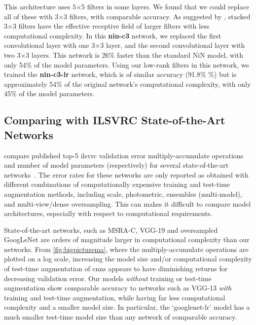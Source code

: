 \documentclass[thesis]{subfiles}
\begin{document}
    This architecture uses $5$$\times$$5$ filters in some layers. We found that we could replace all of these with $3$$\times$$3$ filters, with comparable accuracy. As suggested by \citet{Simonyan2014verydeep}, stacked  $3$$\times$$3$ filters have the effective receptive field of larger filters with less computational complexity. In this \textbf{nin-c3} network, we replaced the first convolutional layer with one $3$$\times$$3$ layer, and the second convolutional layer with two $3$$\times$$3$ layers. This network is 26\% faster than the standard NiN model, with only 54\% of the model parameters. Using our low-rank filters in this network, we trained the \textbf{nin-c3-lr} network, which is of similar accuracy (91.8\% \%) but is approximately 54\% of the original network's computational complexity, with only 45\% of the model parameters.
    
    \subsection{Comparing with ILSVRC State-of-the-Art Networks}
     compare published top-5 \gls{ilsvrc} validation error \vs multiply-accumulate operations and number of model parameters (respectively) for several state-of-the-art networks~\citep{Simonyan2014verydeep,Szegedy2014going,He2015b}. The error rates for these networks are only reported as obtained with different combinations of computationally expensive training and test-time augmentation methods, including scale, photometric, ensembles (multi-model), and multi-view/dense oversampling. This can makes it difficult to compare model architectures, especially with respect to computational requirements.
    
    State-of-the-art networks, such as MSRA-C, VGG-19 and oversampled GoogLeNet are orders of magnitude larger in computational complexity than our networks. From \cref{fig:bigpicturema}, where the multiply-accumulate operations are plotted on a log scale, increasing the model size and/or computational complexity of test-time augmentation of \glspl{cnn} appears to have diminishing returns for decreasing validation error. Our models \emph{without} training or test-time augmentation show comparable accuracy to networks such as VGG-13 \emph{with} training and test-time augmentation, while having far less computational complexity and a smaller model size. In particular, the `googlenet-lr' model has a much smaller test-time model size than any network of comparable accuracy. 
    
\end{document}
